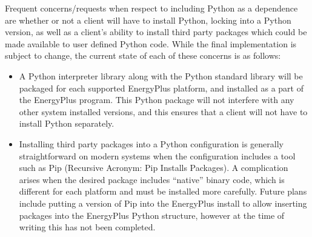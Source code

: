 \documentclass[5p]{elsarticle}
\begin{document}
Frequent concerns/requests when respect to including Python as a dependence are whether or not a client will have to install Python, locking into a Python version, as well as a client’s ability to install third party packages which could be made available to user defined Python code.  While the final implementation is subject to change, the current state of each of these concerns is as follows:

\begin{itemize}
 \item A Python interpreter library along with the Python standard library will be packaged for each supported EnergyPlus platform, and installed as a part of the EnergyPlus program.  This Python package will not interfere with any other system installed versions, and this ensures that a client will not have to install Python separately.
 \item Installing third party packages into a Python configuration is generally straightforward on modern systems when the configuration includes a tool such as Pip (Recursive Acronym: Pip Installs Packages).  A complication arises when the desired package includes “native” binary code, which is different for each platform and must be installed more carefully.  Future plans include putting a version of Pip into the EnergyPlus install to allow inserting packages into the EnergyPlus Python structure, however at the time of writing this has not been completed.
\end{itemize}

 
 
\end{document}
